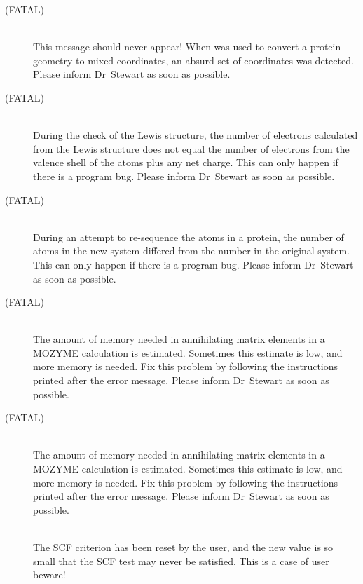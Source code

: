 \begin{description}
\item[ (FATAL)]~\\
This message should never appear!  When  was used to convert
a protein geometry to mixed coordinates, an absurd
set of coordinates was detected.  Please inform Dr~Stewart as soon as possible.

\item[ (FATAL)]~\\
During the check of the Lewis structure, the number of electrons calculated
from the Lewis structure does not equal the number of electrons from the
valence shell of the atoms plus any net charge.  This can only happen if 
there is a program bug.  Please inform Dr~Stewart as soon as possible.

\item[ (FATAL)]~\\
During an attempt to re-sequence the atoms in a protein, the number of atoms
in the new system differed from the number in the original system.
This can only happen if there is a program bug.  
Please inform Dr~Stewart as soon as possible.

\item[ (FATAL)]~\\
The amount of memory needed in annihilating matrix elements in a MOZYME
calculation is estimated.  Sometimes this estimate is low, and more memory
is needed.
Fix this problem by following the instructions printed after the error message.
Please inform Dr~Stewart as soon as possible.

\item[ (FATAL)]~\\
The amount of memory needed in annihilating matrix elements in a MOZYME
calculation is estimated.  Sometimes this estimate is low, and more memory
is needed.
Fix this problem by following the instructions printed after the error message.
Please inform Dr~Stewart as soon as possible.

\item[]~\\
The SCF criterion has been reset by the user, and the new value  is so  small 
that  the SCF test may never be satisfied.  This is a case of user beware!
 

\end{description}

